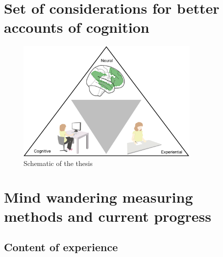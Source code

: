 \section{Set of considerations for better accounts of cognition}


\begin{figure}[H]
	\centering
	\includegraphics[width=0.8\textwidth]{chapters/img/thesisfig1.png}
	\caption{Schematic of the thesis} 
	\label{fig:thesis:fig1}
\end{figure}

\section{Mind wandering measuring methods and current progress}
\label{intro:measures}

\subsection{Content of experience}

